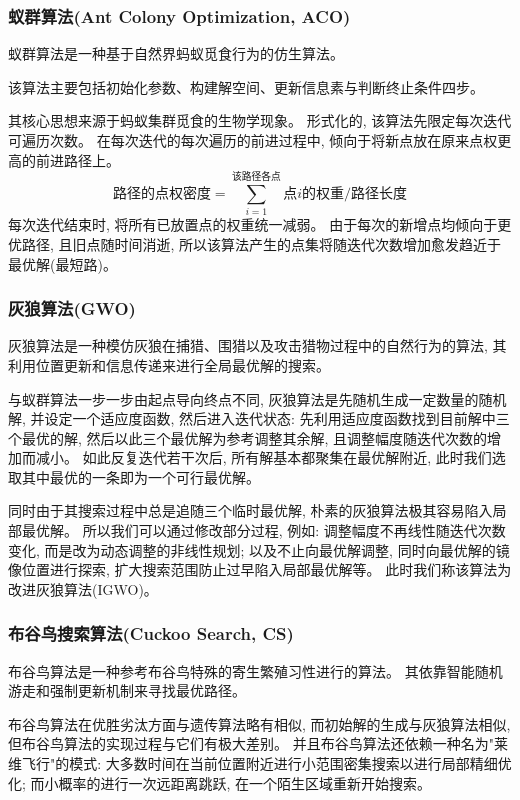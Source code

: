 \documentclass[12pt,a4paper,oneside,UTF8]{ctexart}
\begin{document}
\subsubsection{蚁群算法(Ant Colony Optimization, ACO)}
蚁群算法是一种基于自然界蚂蚁觅食行为的仿生算法。

该算法主要包括初始化参数、构建解空间、更新信息素与判断终止条件四步。

其核心思想来源于蚂蚁集群觅食的生物学现象。
形式化的,
该算法先限定每次迭代可遍历次数。
在每次迭代的每次遍历的前进过程中,
倾向于将新点放在原来点权更高的前进路径上。
\[
\text{路径的点权密度} ={ \sum_{i=1}^{\text{该路径各点}}{\text{点}i\text{的权重}} } / \text{路径长度}
\]
每次迭代结束时,
将所有已放置点的权重统一减弱。
由于每次的新增点均倾向于更优路径,
且旧点随时间消逝,
所以该算法产生的点集将随迭代次数增加愈发趋近于最优解(最短路)。
\subsubsection{灰狼算法(GWO)}
灰狼算法是一种模仿灰狼在捕猎、围猎以及攻击猎物过程中的自然行为的算法,
其利用位置更新和信息传递来进行全局最优解的搜索\textsuperscript{\cite{ref9}}。

与蚁群算法一步一步由起点导向终点不同,
灰狼算法是先随机生成一定数量的随机解,
并设定一个适应度函数,
然后进入迭代状态:
先利用适应度函数找到目前解中三个最优的解,
然后以此三个最优解为参考调整其余解,
且调整幅度随迭代次数的增加而减小。
如此反复迭代若干次后,
所有解基本都聚集在最优解附近,
此时我们选取其中最优的一条即为一个可行最优解\textsuperscript{\cite{ref10}}。

同时由于其搜索过程中总是追随三个临时最优解,
朴素的灰狼算法极其容易陷入局部最优解。
所以我们可以通过修改部分过程,
例如:
调整幅度不再线性随迭代次数变化,
而是改为动态调整的非线性规划;
以及不止向最优解调整,
同时向最优解的镜像位置进行探索,
扩大搜索范围防止过早陷入局部最优解等。
此时我们称该算法为改进灰狼算法(IGWO)。
\subsubsection{布谷鸟搜索算法(Cuckoo Search, CS)}
布谷鸟算法是一种参考布谷鸟特殊的寄生繁殖习性进行的算法。
其依靠智能随机游走和强制更新机制来寻找最优路径。

布谷鸟算法在优胜劣汰方面与遗传算法略有相似,
而初始解的生成与灰狼算法相似,
但布谷鸟算法的实现过程与它们有极大差别。
并且布谷鸟算法还依赖一种名为"莱维飞行"的模式:
大多数时间在当前位置附近进行小范围密集搜索以进行局部精细优化;
而小概率的进行一次远距离跳跃,
在一个陌生区域重新开始搜索。
\end{document}
